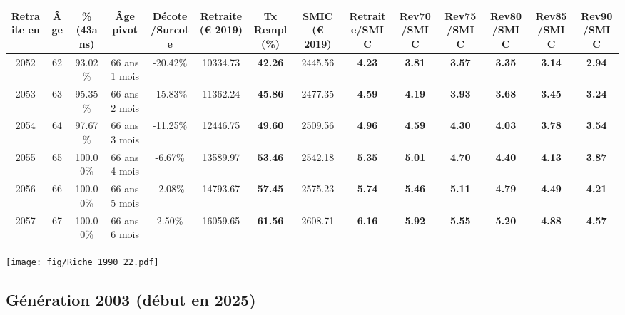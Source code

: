 \begin{adjustbox}{max width=\textwidth} 
\begin{tabular}[htb]{|c|c||c|c|c||c|c||c||c|c|c|c|c|c|} 
\hline 
 Retraite en &  Âge &  \%(43ans) &  Âge pivot &  Décote/Surcote &  Retraite (\euro{} 2019) &  Tx Rempl(\%) &  SMIC (\euro{} 2019) &  Retraite/SMIC &  Rev70/SMIC &  Rev75/SMIC &  Rev80/SMIC &  Rev85/SMIC &  Rev90/SMIC \\ 
\hline \hline 
 2052 &  62 &  93.02\% &  66 ans 1 mois &  -20.42\% &  10334.73 &  {\bf 42.26} &  2445.56 &  {\bf 4.23} &  {\bf 3.81} &  {\bf 3.57} &  {\bf 3.35} &  {\bf 3.14} &  {\bf 2.94} \\ 
\hline 
 2053 &  63 &  95.35\% &  66 ans 2 mois &  -15.83\% &  11362.24 &  {\bf 45.86} &  2477.35 &  {\bf 4.59} &  {\bf 4.19} &  {\bf 3.93} &  {\bf 3.68} &  {\bf 3.45} &  {\bf 3.24} \\ 
\hline 
 2054 &  64 &  97.67\% &  66 ans 3 mois &  -11.25\% &  12446.75 &  {\bf 49.60} &  2509.56 &  {\bf 4.96} &  {\bf 4.59} &  {\bf 4.30} &  {\bf 4.03} &  {\bf 3.78} &  {\bf 3.54} \\ 
\hline 
 2055 &  65 &  100.00\% &  66 ans 4 mois &  -6.67\% &  13589.97 &  {\bf 53.46} &  2542.18 &  {\bf 5.35} &  {\bf 5.01} &  {\bf 4.70} &  {\bf 4.40} &  {\bf 4.13} &  {\bf 3.87} \\ 
\hline 
 2056 &  66 &  100.00\% &  66 ans 5 mois &  -2.08\% &  14793.67 &  {\bf 57.45} &  2575.23 &  {\bf 5.74} &  {\bf 5.46} &  {\bf 5.11} &  {\bf 4.79} &  {\bf 4.49} &  {\bf 4.21} \\ 
\hline 
 2057 &  67 &  100.00\% &  66 ans 6 mois &  2.50\% &  16059.65 &  {\bf 61.56} &  2608.71 &  {\bf 6.16} &  {\bf 5.92} &  {\bf 5.55} &  {\bf 5.20} &  {\bf 4.88} &  {\bf 4.57} \\ 
\hline 
\hline 
\end{tabular} 
\end{adjustbox} 
 
 \vspace{0.1cm} 

 \begin{center}\texttt{[image: fig/Riche\_1990\_22.pdf]}\end{center} \label{fig/Riche_1990_22.pdf} 

\newpage 
 
\subsection{Génération 2003 (début en 2025)} 

